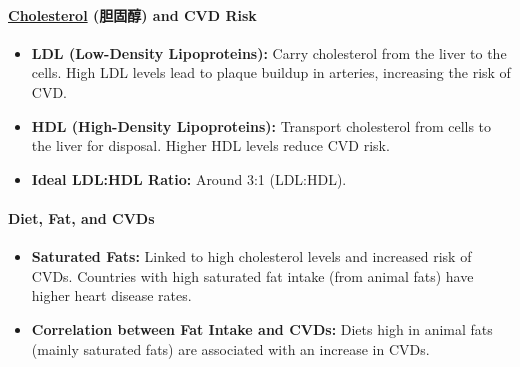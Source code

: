 \paragraph{\underline{Cholesterol} (胆固醇) and CVD Risk}
\begin{itemize}
    \item \textbf{LDL (Low-Density Lipoproteins):} Carry cholesterol from the liver to the cells. High LDL levels lead to plaque
    buildup in arteries, increasing the risk of CVD.
    \item \textbf{HDL (High-Density Lipoproteins):} Transport cholesterol from cells to the liver for disposal. Higher HDL levels
    reduce CVD risk.
    \item \textbf{Ideal LDL:HDL Ratio:} Around 3:1 (LDL:HDL).
\end{itemize}

\paragraph{Diet, Fat, and CVDs}
\begin{itemize}
    \item \textbf{Saturated Fats:} Linked to high cholesterol levels and increased risk of CVDs. Countries with high saturated
    fat intake (from animal fats) have higher heart disease rates.
    \item \textbf{Correlation between Fat Intake and CVDs:} Diets high in animal fats (mainly saturated fats) are associated with
    an increase in CVDs.
\end{itemize}
